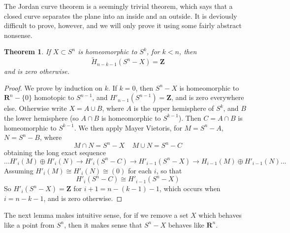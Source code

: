 \documentclass{article}
\theoremstyle{plain}
\newtheorem{theorem}{Theorem}
\begin{document}
The Jordan curve theorem is a seemingly trivial theorem, which says that a closed curve separates the plane into an inside and an outside. It is deviously difficult to prove, however, and we will only prove it using some fairly abstract nonsense.

\begin{theorem}
    If $X \subset S^n$ is homeomorphic to $S^k$, for $k < n$, then 
    \[ \widetilde{H}_{n-k-1}(S^n - X) = \mathbf{Z} \]
    and is zero otherwise.
\end{theorem}
\begin{proof}
    We prove by induction on $k$. If $k = 0$, then $S^n - X$ is homeomorphic to $\mathbf{R}^n - \{ 0 \}$ homotopic to $S^{n-1}$, and $H'_{n-1}(S^{n-1}) = \mathbf{Z}$, and is zero everywhere else. Otherwise write $X = A \cup B$, where $A$ is the upper hemisphere of $S^k$, and $B$ the lower hemisphere (so $A \cap B$ is homeomorphic to $S^{k-1}$). Then $C = A \cap B$ is homeomorphic to $S^{k-1}$. We then apply Mayer Vietoris, for $M = S^n - A$, $N = S^n - B$, where
    \[ M \cap N = S^n - X\ \ \ \ \ M \cup N = S^n - C \]
    obtaining the long exact sequence
    \[ \dots H'_i(M) \oplus H'_i(N) \to H'_i(S^n - C) \to H'_{i-1}(S^n - X) \to H_{i-1}(M) \oplus H'_{i-1}(N) \dots \]
    Assuming $H'_i(M) \cong H'_i(N) \cong (0)$ for each $i$, so that
    \[ H'_i(S^n - C) \cong H'_{i-1}(S^n - X) \]
    So $H'_i(S^n - X) = \mathbf{Z}$ for $i+1 = n-(k-1)-1$, which occurs when $i = n-k-1$, and is zero otherwise.
\end{proof}

The next lemma makes intuitive sense, for if we remove a set $X$ which behaves like a point from $S^n$, then it makes sense that $S^n - X$ behaves like $\mathbf{R}^n$.
\end{document}
